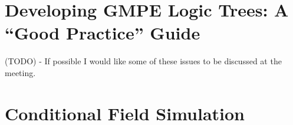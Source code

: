 \section{Developing GMPE Logic Trees: A ``Good Practice'' Guide}
\label{sec:logic_tree}

(TODO) - If possible I would like some of these issues to be discussed at the meeting.

\section{Conditional Field Simulation}
\label{sec:cond_field}